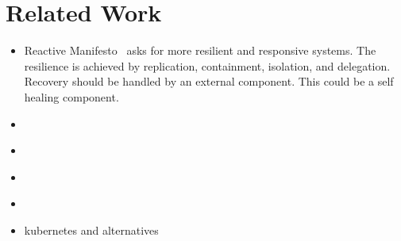 
\section{Related Work}
  \begin{itemize}
    \item Reactive Manifesto~\cite{reactivemanifesto} asks for more resilient and responsive systems. The resilience is achieved by replication, containment, isolation, and delegation. Recovery should be handled by an external component. This could be a self healing component.
    \item \cite{ToffettiMicroservices}
    \item \cite{StackCloud}
    \item \cite{gru}
    \item \cite{DashofyArchitecture}
    \item \gls{kubernetes} and alternatives
  \end{itemize}

